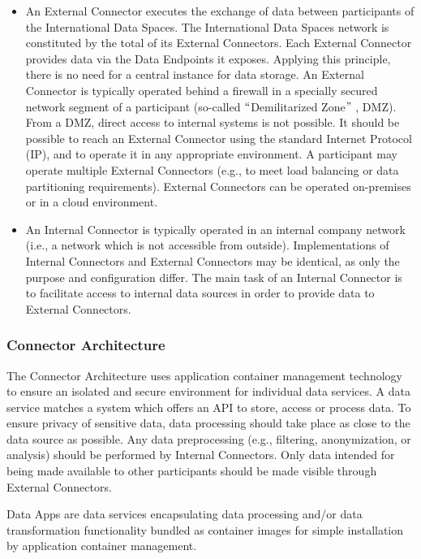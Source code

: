 \begin{itemize}
	\item An External Connector executes the exchange of data between participants of the International Data Spaces. The International Data Spaces network is constituted by the total of its External Connectors. Each External Connector provides data via the Data Endpoints it exposes. Applying this principle, there is no need for a central instance for data storage. An External Connector is typically operated behind a firewall in a specially secured network segment of a participant (so-called $``$Demilitarized Zone$"$ , DMZ). From a DMZ, direct access to internal systems is not possible. It should be possible to reach an External Connector using the standard Internet Protocol (IP), and to operate it in any appropriate environment. A participant may operate multiple External Connectors (e.g., to meet load balancing or data partitioning requirements). External Connectors can be operated on-premises or in a cloud environment.

	\item An Internal Connector is typically operated in an internal company network (i.e., a network which is not accessible from outside). Implementations of Internal Connectors and External Connectors may be identical, as only the purpose and configuration differ. The main task of an Internal Connector is to facilitate access to internal data sources in order to provide data to External Connectors.
\end{itemize}

\subsubsection{Connector Architecture}
The Connector Architecture uses application container management technology to ensure an isolated and secure environment for individual data services. A data service matches a system which offers an API to store, access or process data. To ensure privacy of sensitive data, data processing should take place as close to the data source as possible. Any data preprocessing (e.g., filtering, anonymization, or analysis) should be performed by Internal Connectors. Only data intended for being made available to other participants should be made visible through External Connectors.

Data Apps are data services encapsulating data processing and/or data transformation functionality bundled as container images for simple installation by application container management.

